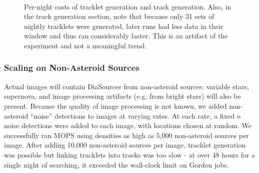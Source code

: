 \begin{figure}[ht!]
  \centering
  \\

  \caption{Per-night costs of tracklet generation and track
    generation. Also, in the track generation section,
    note that because only 31 sets of nightly tracklets were
    generated, later runs had less data in their window and thus ran
    considerably faster.  This is an artifact of the experiment and
    not a meaningful trend.}
  \label{nightlyVariance}
\end{figure}


\subsubsection{Scaling on Non-Asteroid Sources}

Actual images will contain DiaSources from non-asteroid sources:
variable stars, supernova, and image processing artifacts (e.g. from
bright stars) will also be present.  Because the quality of image
processing is not known, we added non-asteroid ``noise'' detections to
images at varying rates.  At each rate, a fixed $n$ noise detections
were added to each image, with locations chosen at random.  We
successfully ran MOPS using densities as high as 5,000 non-asteroid
sources per image.  After adding 10,000 non-asteroid sources per
image, tracklet generation was possible but linking tracklets into
tracks was too slow - at over 48 hours for a single night of
searching, it exceeded the wall-clock limit on Gordon jobs.

